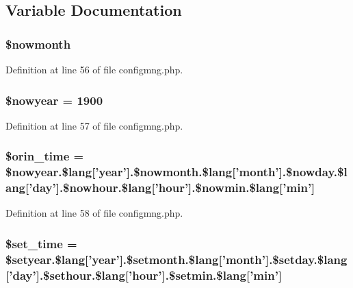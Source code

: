 \subsection{Variable Documentation}
\hypertarget{configmng_8php_abec251fa3431224f4ef12bbe94f3cb00}{
\subsubsection[{\$nowmonth}]{\setlength{\rightskip}{0pt plus 5cm}\$nowmonth}}\label{configmng_8php_abec251fa3431224f4ef12bbe94f3cb00}


Definition at line 56 of file configmng.\+php.

\hypertarget{configmng_8php_abbdd318e2a9fe9ad5799b9e6170e9c89}{
\subsubsection[{\$nowyear}]{\setlength{\rightskip}{0pt plus 5cm}\$nowyear = 1900}}\label{configmng_8php_abbdd318e2a9fe9ad5799b9e6170e9c89}


Definition at line 57 of file configmng.\+php.

\hypertarget{configmng_8php_a08b80099c663582a6f171ae6340787cd}{
\subsubsection[{\$orin\+\_\+time}]{\setlength{\rightskip}{0pt plus 5cm}\$orin\+\_\+time = \${\bf nowyear.\$lang}\mbox{[}'year'\mbox{]}.\${\bf nowmonth.\$lang}\mbox{[}'month'\mbox{]}.\${\bf nowday.\$lang}\mbox{[}'day'\mbox{]}.\${\bf nowhour.\$lang}\mbox{[}'hour'\mbox{]}.\${\bf nowmin.\$lang}\mbox{[}'min'\mbox{]}}}\label{configmng_8php_a08b80099c663582a6f171ae6340787cd}


Definition at line 58 of file configmng.\+php.

\hypertarget{configmng_8php_a655ccb5ffe64589a8852070d977d18b4}{
\subsubsection[{\$set\+\_\+time}]{\setlength{\rightskip}{0pt plus 5cm}\$set\+\_\+time = \${\bf setyear.\$lang}\mbox{[}'year'\mbox{]}.\${\bf setmonth.\$lang}\mbox{[}'month'\mbox{]}.\${\bf setday.\$lang}\mbox{[}'day'\mbox{]}.\${\bf sethour.\$lang}\mbox{[}'hour'\mbox{]}.\${\bf setmin.\$lang}\mbox{[}'min'\mbox{]}}}\label{configmng_8php_a655ccb5ffe64589a8852070d977d18b4}


